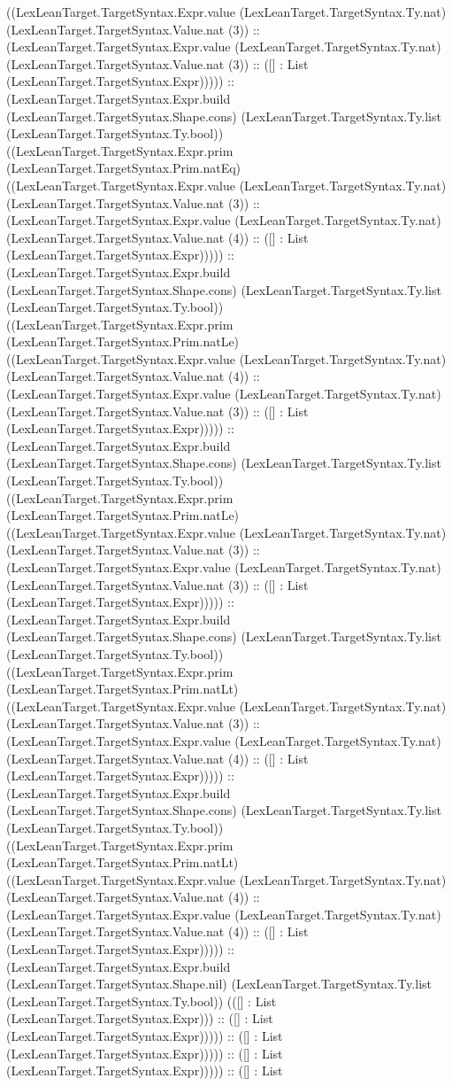 \documentclass[11pt]{article}
\begin{document}
((LexLeanTarget.TargetSyntax.Expr.value (LexLeanTarget.TargetSyntax.Ty.nat) (LexLeanTarget.TargetSyntax.Value.nat (3)) :: (LexLeanTarget.TargetSyntax.Expr.value (LexLeanTarget.TargetSyntax.Ty.nat) (LexLeanTarget.TargetSyntax.Value.nat (3)) :: ([] : List (LexLeanTarget.TargetSyntax.Expr))))) :: (LexLeanTarget.TargetSyntax.Expr.build (LexLeanTarget.TargetSyntax.Shape.cons) (LexLeanTarget.TargetSyntax.Ty.list (LexLeanTarget.TargetSyntax.Ty.bool)) ((LexLeanTarget.TargetSyntax.Expr.prim (LexLeanTarget.TargetSyntax.Prim.natEq) ((LexLeanTarget.TargetSyntax.Expr.value (LexLeanTarget.TargetSyntax.Ty.nat) (LexLeanTarget.TargetSyntax.Value.nat (3)) :: (LexLeanTarget.TargetSyntax.Expr.value (LexLeanTarget.TargetSyntax.Ty.nat) (LexLeanTarget.TargetSyntax.Value.nat (4)) :: ([] : List (LexLeanTarget.TargetSyntax.Expr))))) :: (LexLeanTarget.TargetSyntax.Expr.build (LexLeanTarget.TargetSyntax.Shape.cons) (LexLeanTarget.TargetSyntax.Ty.list (LexLeanTarget.TargetSyntax.Ty.bool)) ((LexLeanTarget.TargetSyntax.Expr.prim (LexLeanTarget.TargetSyntax.Prim.natLe) ((LexLeanTarget.TargetSyntax.Expr.value (LexLeanTarget.TargetSyntax.Ty.nat) (LexLeanTarget.TargetSyntax.Value.nat (4)) :: (LexLeanTarget.TargetSyntax.Expr.value (LexLeanTarget.TargetSyntax.Ty.nat) (LexLeanTarget.TargetSyntax.Value.nat (3)) :: ([] : List (LexLeanTarget.TargetSyntax.Expr))))) :: (LexLeanTarget.TargetSyntax.Expr.build (LexLeanTarget.TargetSyntax.Shape.cons) (LexLeanTarget.TargetSyntax.Ty.list (LexLeanTarget.TargetSyntax.Ty.bool)) ((LexLeanTarget.TargetSyntax.Expr.prim (LexLeanTarget.TargetSyntax.Prim.natLe) ((LexLeanTarget.TargetSyntax.Expr.value (LexLeanTarget.TargetSyntax.Ty.nat) (LexLeanTarget.TargetSyntax.Value.nat (3)) :: (LexLeanTarget.TargetSyntax.Expr.value (LexLeanTarget.TargetSyntax.Ty.nat) (LexLeanTarget.TargetSyntax.Value.nat (3)) :: ([] : List (LexLeanTarget.TargetSyntax.Expr))))) :: (LexLeanTarget.TargetSyntax.Expr.build (LexLeanTarget.TargetSyntax.Shape.cons) (LexLeanTarget.TargetSyntax.Ty.list (LexLeanTarget.TargetSyntax.Ty.bool)) ((LexLeanTarget.TargetSyntax.Expr.prim (LexLeanTarget.TargetSyntax.Prim.natLt) ((LexLeanTarget.TargetSyntax.Expr.value (LexLeanTarget.TargetSyntax.Ty.nat) (LexLeanTarget.TargetSyntax.Value.nat (3)) :: (LexLeanTarget.TargetSyntax.Expr.value (LexLeanTarget.TargetSyntax.Ty.nat) (LexLeanTarget.TargetSyntax.Value.nat (4)) :: ([] : List (LexLeanTarget.TargetSyntax.Expr))))) :: (LexLeanTarget.TargetSyntax.Expr.build (LexLeanTarget.TargetSyntax.Shape.cons) (LexLeanTarget.TargetSyntax.Ty.list (LexLeanTarget.TargetSyntax.Ty.bool)) ((LexLeanTarget.TargetSyntax.Expr.prim (LexLeanTarget.TargetSyntax.Prim.natLt) ((LexLeanTarget.TargetSyntax.Expr.value (LexLeanTarget.TargetSyntax.Ty.nat) (LexLeanTarget.TargetSyntax.Value.nat (4)) :: (LexLeanTarget.TargetSyntax.Expr.value (LexLeanTarget.TargetSyntax.Ty.nat) (LexLeanTarget.TargetSyntax.Value.nat (4)) :: ([] : List (LexLeanTarget.TargetSyntax.Expr))))) :: (LexLeanTarget.TargetSyntax.Expr.build (LexLeanTarget.TargetSyntax.Shape.nil) (LexLeanTarget.TargetSyntax.Ty.list (LexLeanTarget.TargetSyntax.Ty.bool)) (([] : List (LexLeanTarget.TargetSyntax.Expr))) :: ([] : List (LexLeanTarget.TargetSyntax.Expr))))) :: ([] : List (LexLeanTarget.TargetSyntax.Expr))))) :: ([] : List (LexLeanTarget.TargetSyntax.Expr))))) :: ([] : List 
\end{document}
